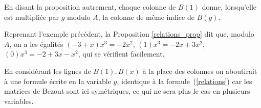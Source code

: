 \documentclass{standalone}
\begin{document}
\begin{rem}
En disant la  proposition autrement, chaque colonne de $B(1)$ donne, lorsqu'elle est multipliée par $g$ modulo $A$, la colonne de même indice de $B(g)$.
\end{rem}

\begin{exmp}
Reprenant l'exemple précédent, la Proposition \ref{relations_prop} dit que, modulo $A$, on a les égalités $(-3 + x)x^3 = -2x^2$, $(1)x^3 = -2x + 3x^2$, $(0)x^3 = -2 + 3x - x^2$, qui se vérifient facilement.
\end{exmp}

\begin{rem}
En considérant les lignes de $B(1), B(x)$ à la place des colonnes on aboutirait à une formule écrite en la variable $y$, identique à la formule~(\ref{relations}) car les matrices de Bezout sont ici symétriques, ce qui ne sera plus le cas en plusieurs variables.
\end{rem}
\end{document}
